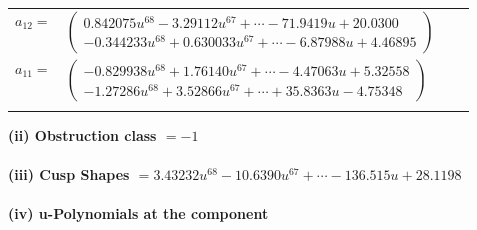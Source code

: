 \documentclass[1p]{elsarticle_modified}
\theoremstyle{definition}
\begin{document}
\begin{tabular}{m{7pt} m{180pt} m{7pt} m{180pt} }
\flushright $a_{12}=$&$\begin{pmatrix}0.842075 u^{68}-3.29112 u^{67}+\cdots-71.9419 u+20.0300\\-0.344233 u^{68}+0.630033 u^{67}+\cdots-6.87988 u+4.46895\end{pmatrix}$ \\
\flushright $a_{11}=$&$\begin{pmatrix}-0.829938 u^{68}+1.76140 u^{67}+\cdots-4.47063 u+5.32558\\-1.27286 u^{68}+3.52866 u^{67}+\cdots+35.8363 u-4.75348\end{pmatrix}$\\&\end{tabular}
\flushleft \textbf{(ii) Obstruction class $= -1$}\\~\\
\flushleft \textbf{(iii) Cusp Shapes $= 3.43232 u^{68}-10.6390 u^{67}+\cdots-136.515 u+28.1198$}\\~\\
\newpage\renewcommand{\arraystretch}{1}
\flushleft \textbf{(iv) u-Polynomials at the component}\newline \\
\end{document}
